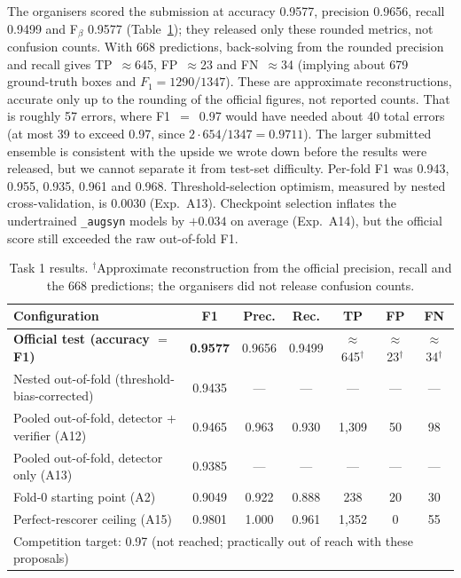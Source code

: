 The organisers scored the submission at accuracy 0.9577, precision 0.9656, recall
0.9499 and F$_\beta$ 0.9577 (Table~\ref{tab:t1-results}); they released only these
rounded metrics, not confusion counts. With 668 predictions, back-solving from the
rounded precision and recall gives TP~$\approx$645, FP~$\approx$23 and FN~$\approx$34
(implying about 679 ground-truth boxes and $F_1=1290/1347$). These are approximate
reconstructions, accurate only up to the rounding of the official figures, not
reported counts. That is roughly 57 errors, where F1~$=$~0.97 would have needed about
40 total errors (at most 39 to exceed 0.97, since $2\cdot654/1347=0.9711$). The larger
submitted ensemble is consistent with
the upside we wrote down before the results were released, but we cannot separate it
from test-set difficulty. Per-fold F1 was 0.943, 0.955, 0.935, 0.961 and 0.968. Threshold-selection optimism, measured by
nested cross-validation, is 0.0030 (Exp.~A13). Checkpoint selection inflates the
undertrained \texttt{\_augsyn} models by $+0.034$ on average (Exp.~A14), but the
official score still exceeded the raw out-of-fold F1.

\begin{table}[t]
\caption{Task 1 results. $^\dagger$Approximate reconstruction from the official precision, recall and the 668 predictions; the organisers did not release confusion counts.}\label{tab:t1-results}
\centering
\small\setlength{\tabcolsep}{4pt}
\begin{tabular}{lcccccc}
\toprule
Configuration & F1 & Prec. & Rec. & TP & FP & FN \\
\midrule
\textbf{Official test (accuracy $=$ F1)} & \textbf{0.9577} & 0.9656 & 0.9499 & $\approx$645$^\dagger$ & $\approx$23$^\dagger$ & $\approx$34$^\dagger$ \\
Nested out-of-fold (threshold-bias-corrected) & 0.9435 & --- & --- & --- & --- & --- \\
Pooled out-of-fold, detector + verifier (A12) & 0.9465 & 0.963 & 0.930 & 1{,}309 & 50 & 98 \\
Pooled out-of-fold, detector only (A13) & 0.9385 & --- & --- & --- & --- & --- \\
Fold-0 starting point (A2) & 0.9049 & 0.922 & 0.888 & 238 & 20 & 30 \\
Perfect-rescorer ceiling (A15) & 0.9801 & 1.000 & 0.961 & 1{,}352 & 0 & 55 \\
\midrule
\multicolumn{7}{l}{Competition target: 0.97 (not reached; practically out of reach with these proposals)} \\
\bottomrule
\end{tabular}
\end{table}

